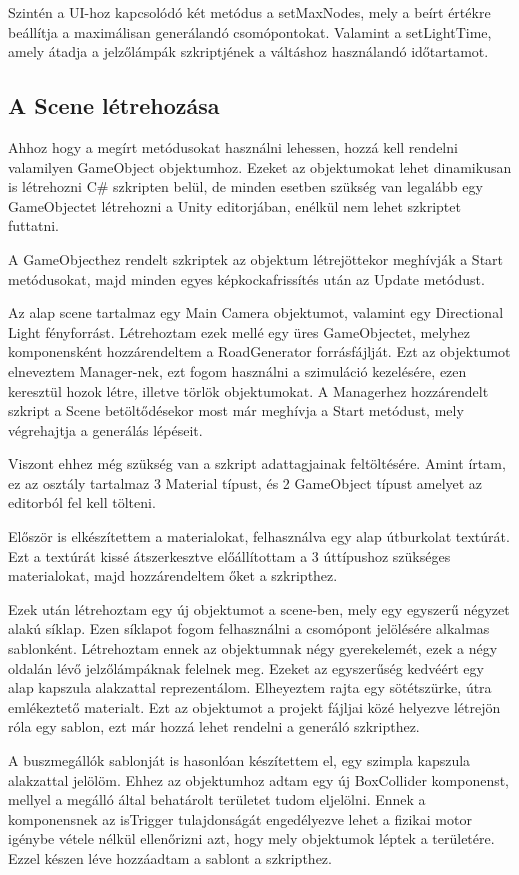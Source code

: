 Szintén a UI-hoz kapcsolódó két metódus a setMaxNodes, mely a beírt értékre beállítja a maximálisan generálandó csomópontokat. Valamint a setLightTime, amely átadja a jelzőlámpák szkriptjének a váltáshoz használandó időtartamot.
\subsection{A Scene létrehozása}
Ahhoz hogy a megírt metódusokat használni lehessen, hozzá kell rendelni valamilyen GameObject objektumhoz. Ezeket az objektumokat lehet dinamikusan is létrehozni C\# szkripten belül, de minden esetben szükség van legalább egy GameObjectet létrehozni a Unity editorjában, enélkül nem lehet szkriptet futtatni.

A GameObjecthez rendelt szkriptek az objektum létrejöttekor meghívják a Start metódusokat, majd minden egyes képkockafrissítés után az Update metódust.

Az alap scene tartalmaz egy Main Camera objektumot, valamint egy Directional Light fényforrást. Létrehoztam ezek mellé egy üres GameObjectet, melyhez komponensként hozzárendeltem a RoadGenerator forrásfájlját. Ezt az objektumot elneveztem Manager-nek, ezt fogom használni a szimuláció kezelésére, ezen keresztül hozok létre, illetve törlök objektumokat. A Managerhez hozzárendelt szkript a Scene betöltődésekor most már meghívja a Start metódust, mely végrehajtja a generálás lépéseit.

Viszont ehhez még szükség van a szkript adattagjainak feltöltésére. Amint írtam, ez az osztály tartalmaz 3 Material típust, és 2 GameObject típust amelyet az editorból fel kell tölteni. 

Először is elkészítettem a materialokat, felhasználva egy alap útburkolat textúrát. Ezt a textúrát kissé átszerkesztve előállítottam a 3 úttípushoz szükséges materialokat, majd hozzárendeltem őket a szkripthez.

Ezek után létrehoztam egy új objektumot a scene-ben, mely egy egyszerű négyzet alakú síklap. Ezen síklapot fogom felhasználni a csomópont jelölésére alkalmas sablonként. Létrehoztam ennek az objektumnak négy gyerekelemét, ezek a négy oldalán lévő jelzőlámpáknak felelnek meg. Ezeket az egyszerűség kedvéért egy alap kapszula alakzattal reprezentálom. Elheyeztem rajta egy sötétszürke, útra emlékeztető materialt. Ezt az objektumot a projekt fájljai közé helyezve létrejön róla egy sablon, ezt már hozzá lehet rendelni a generáló szkripthez.

A buszmegállók sablonját is hasonlóan készítettem el, egy szimpla kapszula alakzattal jelölöm. Ehhez az objektumhoz adtam egy új BoxCollider komponenst, mellyel a megálló által behatárolt területet tudom eljelölni. Ennek a komponensnek az isTrigger tulajdonságát engedélyezve lehet a fizikai motor igénybe vétele nélkül ellenőrizni azt, hogy mely objektumok léptek a területére. Ezzel készen léve hozzáadtam a sablont a szkripthez.

